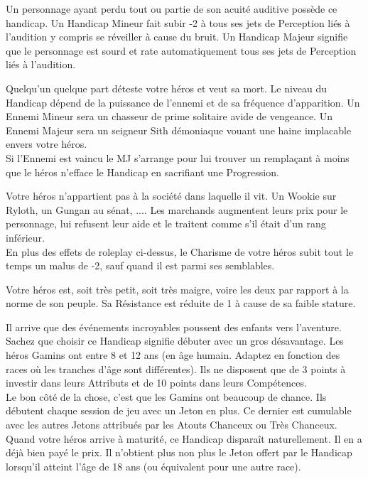 \begin{description}[align=left]
    \item [Dur d’Oreille (Mineur ou Majeur)]
        Un personnage ayant perdu tout ou partie de son acuité auditive possède ce handicap. Un Handicap Mineur fait subir -2 à tous ses jets de Perception liés à l'audition y compris se réveiller à cause du bruit. Un Handicap Majeur signifie que le personnage est sourd et rate automatiquement tous ses jets de Perception liés à l'audition.

    \item [Ennemi (Mineur ou Majeur)]
        Quelqu'un quelque part déteste votre héros et veut sa mort. Le niveau du Handicap dépend de la puissance de l'ennemi et de sa fréquence d'apparition. Un Ennemi Mineur sera un chasseur de prime solitaire avide de vengeance. Un Ennemi Majeur sera un seigneur Sith démoniaque vouant une haine implacable envers votre héros.\\
        Si l'Ennemi est vaincu le MJ s'arrange pour lui trouver un remplaçant à moins que le héros n'efface le Handicap en sacrifiant une Progression.

    \item [Étranger (Mineur)]
        Votre héros n'appartient pas à la société dans laquelle il vit. Un Wookie sur Ryloth, un Gungan au sénat, .... Les marchands augmentent leurs prix pour le personnage, lui refusent leur aide et le traitent comme s'il était d'un rang inférieur. \\
        En plus des effets de roleplay ci-dessus, le Charisme de votre héros subit tout le temps un malus de -2, sauf quand il est parmi ses semblables.

    \item [Frêle (Majeur)]
        Votre héros est, soit très petit, soit très maigre, voire les deux par rapport à la norme de son peuple. Sa Résistance est réduite de 1 à cause de sa faible stature.

    \item [Gamin (Majeur)]
        Il arrive que des événements incroyables poussent des enfants vers l'aventure. Sachez que choisir ce Handicap signifie débuter avec un gros désavantage. Les héros Gamins ont entre 8 et 12 ans (en âge humain. Adaptez en fonction des races où les tranches d'âge sont différentes). Ils ne disposent que de 3 points à investir dans leurs Attributs et de 10 points dans leurs Compétences.\\
        Le bon côté de la chose, c'est que les Gamins ont beaucoup de chance. Ils débutent chaque session de jeu avec un Jeton en plus. Ce dernier est cumulable avec les autres Jetons attribués par les Atouts Chanceux ou Très Chanceux. Quand votre héros arrive à maturité, ce Handicap disparaît naturellement. Il en a déjà bien payé le prix. Il n'obtient plus non plus le Jeton offert par le Handicap lorsqu'il atteint l'âge de 18 ans (ou équivalent pour une autre race).


\end{description}
